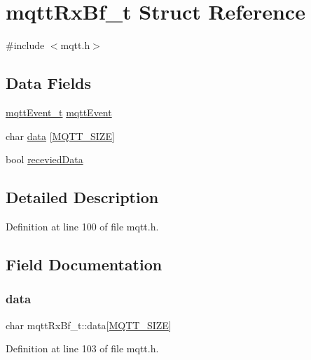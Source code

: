 \hypertarget{structmqttRxBf__t}{}\section{mqtt\+Rx\+Bf\+\_\+t Struct Reference}
\label{structmqttRxBf__t}


{\ttfamily \#include $<$mqtt.\+h$>$}

\subsection*{Data Fields}
\begin{DoxyCompactItemize}
\item 
\hyperlink{mqtt_8h_addc2504b9e66d98288c510964264c855}{mqtt\+Event\+\_\+t} \hyperlink{structmqttRxBf__t_af14afe6989fa691721b612eb6aea9a87}{mqtt\+Event}
\item 
char \hyperlink{structmqttRxBf__t_a219c07affa381c0a3024ad757f14ed29}{data} \mbox{[}\hyperlink{mqtt_8h_ab4dd3a15b57435a3cd9a97736f4366a8}{M\+Q\+T\+T\+\_\+\+S\+I\+ZE}\mbox{]}
\item 
bool \hyperlink{structmqttRxBf__t_ab9e321c2fedce83b4720d93b5eeaacc7}{recevied\+Data}
\end{DoxyCompactItemize}


\subsection{Detailed Description}


Definition at line 100 of file mqtt.\+h.



\subsection{Field Documentation}
\mbox{\label{structmqttRxBf__t_a219c07affa381c0a3024ad757f14ed29}} 
\subsubsection{\texorpdfstring{data}{data}}
{\footnotesize\ttfamily char mqtt\+Rx\+Bf\+\_\+t\+::data\mbox{[}\hyperlink{mqtt_8h_ab4dd3a15b57435a3cd9a97736f4366a8}{M\+Q\+T\+T\+\_\+\+S\+I\+ZE}\mbox{]}}



Definition at line 103 of file mqtt.\+h.

